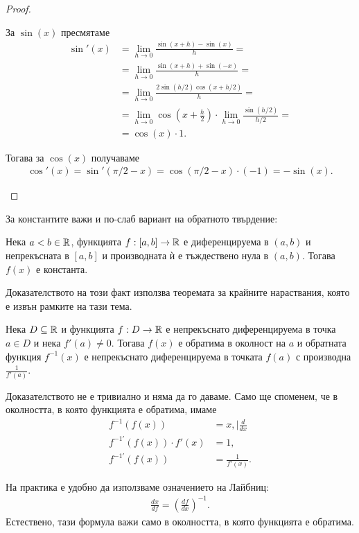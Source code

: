 \documentclass[numbers=endperiod, bibliography=totocnumbered]{scrartcl}
\begin{document}
\begin{proof}
\begin{enumerate}
    За \( \sin(x) \) пресмятаме
    \begin{align*}
      \sin'(x)
      &=
      \lim_{h \to 0} \frac {\sin(x+h) - \sin(x)} h
      = \\ &=
      \lim_{h \to 0} \frac {\sin(x+h) + \sin(-x)} h
      = \\ &=
      \lim_{h \to 0} \frac {2 \sin(h / 2) \cos(x+h/2)} h
      = \\ &=
      \lim_{h \to 0} \cos \left(x + \frac h 2 \right) \cdot \lim_{h \to 0} \frac {\sin(h / 2)} {h/2}
      = \\ &=
      \cos(x) \cdot 1.
    \end{align*}

    Тогава за \( \cos(x) \) получаваме
    \begin{align*}
      \cos'(x) = \sin'(\pi / 2 - x) = \cos(\pi / 2 - x) \cdot (-1) = -\sin(x).
    \end{align*}
  \end{enumerate}
\end{proof}

За константите важи и по-слаб вариант на обратното твърдение:
\begin{proposition}\label{thm:zero-derivative}
  Нека \( a < b \in \mathbb{R} \), функцията \( f: [a, b] \to \mathbb{R} \) е диференцируема в \( (a, b) \) и непрекъсната в \( [a, b] \) и производната ѝ е тъждествено нула в \( (a, b) \). Тогава \( f(x) \) е константа.
\end{proposition}
\begin{note}
  Доказателството на този факт използва теоремата за крайните нараствания, която е извън рамките на тази тема.
\end{note}

\begin{theorem}
  Нека \( D \subseteq \mathbb{R} \) и функцията \( f: D \to \mathbb{R} \) е непрекъснато диференцируема в точка \( a \in D \) и нека \( f'(a) \neq 0 \). Тогава \( f(x) \) е обратима в околност на \( a \) и обратната функция \( f^{-1} (x) \) е непрекъснато диференцируема в точката \( f(a) \) с производна \( \frac 1 {f'(a)} \).
\end{theorem}
\begin{note}
  Доказателството не е тривиално и няма да го даваме. Само ще споменем, че в околността, в която функцията е обратима, имаме
  \begin{align*}
    f^{-1}(f(x)) &= x, \mid \frac d {dx}
    \\
    f^{-1'}(f(x)) \cdot f'(x) &= 1,
    \\
    f^{-1'}(f(x)) &= \frac 1 {f'(x)}.
  \end{align*}

  На практика е удобно да използваме означението на Лайбниц:
  \begin{align*}
    \frac {dx} {df} = {\left( \frac {df} {dx} \right)}^{-1}.
  \end{align*}
  Естествено, тази формула важи само в околността, в която функцията е обратима.
\end{note}
\end{document}
